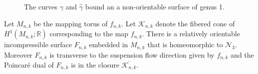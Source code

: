 
\begin{figure}[h]
    \centering
    \caption{The curves $\gamma$ and $\widehat{\gamma}$ bound an a non-orientable surface of genus 1.}
    \label{fig:gammacurves}
\end{figure}

\begin{prop}
\label{lem:genus3}
Let $M_{n,k}$ be the mapping torus of $f_{n,k}$. Let $\mathcal{K}_{n,k}$ denote the fibered cone of
$H^1(M_{n,k};\mathbb{R})$ corresponding to the map $f_{n,k}$. 
There is a relatively orientable incompressible surface $F_{n,k}$ embedded in $M_{n,k}$ that is homeomorphic to $\mathcal{N}_3$.
Moreover $F_{n,k}$ is transverse to the suspension flow direction given by $f_{n,k}$ and the Poincar\'e dual of $F_{n,k}$ is in
the closure $\overline{\mathcal{K}_{n,k}}$.
\end{prop}
